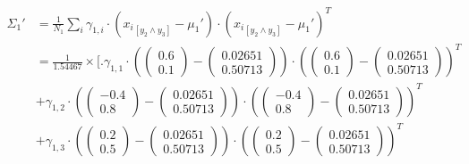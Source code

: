 \documentclass[12pt]{article}
\begin{document}
\begin{enumerate}[leftmargin=\labelsep]
        \begingroup
        \allowdisplaybreaks
        \begin{align*}
          \Sigma_1' & = \frac{1}{N_1} \sum_{i} \gamma_{1,i} \cdot \left({x_i}_{[y_2 \land y_3]} - \mu_1'\right) \cdot ({x_i}_{[y_2 \land y_3]} - \mu_1')^T                                                                                                             \\
                    & = \frac{1}{1.54467} \times \Bigg[ \Bigg.
          \gamma_{1,1} \cdot \left(\begin{pmatrix} 0.6 \\ 0.1 \end{pmatrix} - \begin{pmatrix} 0.02651 \\ 0.50713 \end{pmatrix}\right) \cdot \left(\begin{pmatrix} 0.6 \\ 0.1 \end{pmatrix} - \begin{pmatrix} 0.02651 \\ 0.50713 \end{pmatrix}\right)^T                 \\
                    & + \gamma_{1,2} \cdot \left(\begin{pmatrix} -0.4 \\ 0.8 \end{pmatrix} - \begin{pmatrix} 0.02651 \\ 0.50713 \end{pmatrix}\right) \cdot \left(\begin{pmatrix} -0.4 \\ 0.8 \end{pmatrix} - \begin{pmatrix} 0.02651 \\ 0.50713 \end{pmatrix}\right)^T \\
                    & + \gamma_{1,3} \cdot \left(\begin{pmatrix} 0.2 \\ 0.5 \end{pmatrix} - \begin{pmatrix} 0.02651 \\ 0.50713 \end{pmatrix}\right) \cdot \left(\begin{pmatrix} 0.2 \\ 0.5 \end{pmatrix} - \begin{pmatrix} 0.02651 \\ 0.50713 \end{pmatrix}\right)^T   \\

\end{align*}
\end{enumerate}
\end{document}
